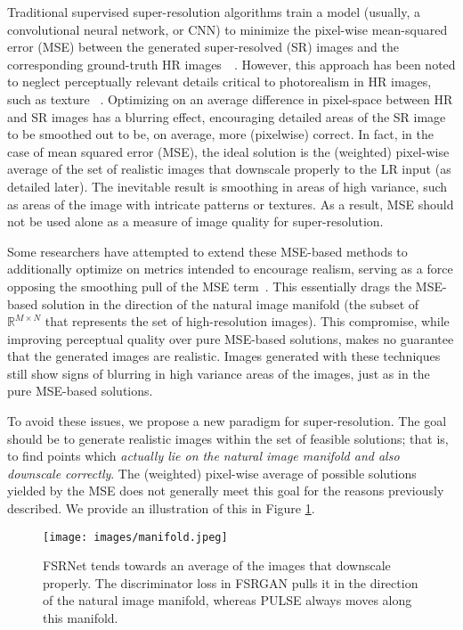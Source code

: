 \documentclass[10pt,twocolumn,letterpaper]{article}
\begin{document}
Traditional supervised super-resolution algorithms train a model (usually, a convolutional neural network, or CNN) to minimize the pixel-wise mean-squared error (MSE) between the generated super-resolved (SR) images and the corresponding ground-truth HR images~\cite{VDSR}~\cite{chen2018fsrnet}. However, this approach has been noted to neglect perceptually relevant details critical to photorealism in HR images, such as texture ~\cite{SRGAN}. Optimizing on an average difference in pixel-space between HR and SR images has a blurring effect, encouraging detailed areas of the SR image to be smoothed out to be, on average, more (pixelwise) correct. In fact, in the case of mean squared error (MSE), the ideal solution is the (weighted) pixel-wise average of the set of realistic images that downscale properly to the LR input (as detailed later). The inevitable result is smoothing in areas of high variance, such as areas of the image with intricate patterns or textures. As a result, MSE should not be used alone as a measure of image quality for super-resolution.

Some researchers have attempted to extend these MSE-based methods to additionally optimize on metrics intended to encourage realism, serving as a force opposing the smoothing pull of the MSE term~\cite{SRGAN,chen2018fsrnet}. This essentially drags the MSE-based solution in the direction of the natural image manifold (the subset of $\mathbb{R}^{M \times N}$ that represents the set of high-resolution images). This compromise, while improving perceptual quality over pure MSE-based solutions, makes no guarantee that the generated images are realistic. Images generated with these techniques still show signs of blurring in high variance areas of the images, just as in the pure MSE-based solutions.

To avoid these issues, we propose a new paradigm for super-resolution. The goal should be to generate realistic images within the set of feasible solutions; that is, to find points which \textit{actually lie on the natural image manifold and also downscale correctly}. The (weighted) pixel-wise average of possible solutions yielded by the MSE does not generally meet this goal for the reasons previously described. We provide an illustration of this in Figure \ref{fig:manifold}.

\begin{figure}[!t]
    \centering
    \texttt{[image: images/manifold.jpeg]}
    \caption{FSRNet tends towards an average of the images that downscale properly. The discriminator loss in FSRGAN pulls it in the direction of the natural image manifold, whereas PULSE always moves along this manifold.}
    \label{fig:manifold}
\end{figure}
\end{document}
